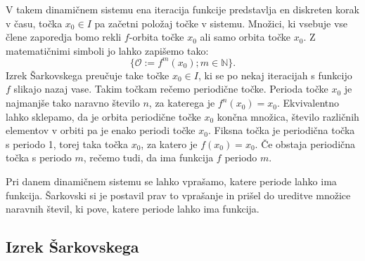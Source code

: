 \documentclass[mat2]{fmfdelo}
\newcommand{\N}{\mathbb N}
\begin{document}
V takem dinamičnem sistemu ena iteracija funkcije predstavlja en diskreten korak v času, točka $x_0 \in I$ pa začetni položaj točke v sistemu. Množici, ki vsebuje vse člene zaporedja bomo rekli $f$-orbita točke $x_0$ ali samo orbita točke $x_0$. Z matematičnimi simboli jo lahko zapišemo tako:
$$\{ \mathcal{O} := f^m(x_0) ; m \in \N \}.$$
Izrek Šarkovskega preučuje take točke $x_0 \in I$, ki se po nekaj iteracijah s funkcijo $f$ slikajo nazaj vase. Takim točkam rečemo periodične točke. Perioda točke $x_0$ je najmanjše tako naravno število $n$, za katerega je $f^n(x_0) = x_0$. Ekvivalentno lahko sklepamo, da je orbita periodične točke $x_0$ končna množica, število različnih elementov v orbiti pa je enako periodi točke $x_0$. Fiksna točka je periodična točka s periodo 1, torej taka točka $x_0$, za katero je $f(x_0) = x_0$. Če obstaja periodična točka s periodo $m$, rečemo tudi, da ima funkcija $f$ periodo $m$.

Pri danem dinamičnem sistemu se lahko vprašamo, katere periode lahko ima funkcija. Šarkovski si je postavil prav to vprašanje in prišel do ureditve množice naravnih števil, ki pove, katere periode lahko ima funkcija.

\subsection{Izrek Šarkovskega}
\end{document}
